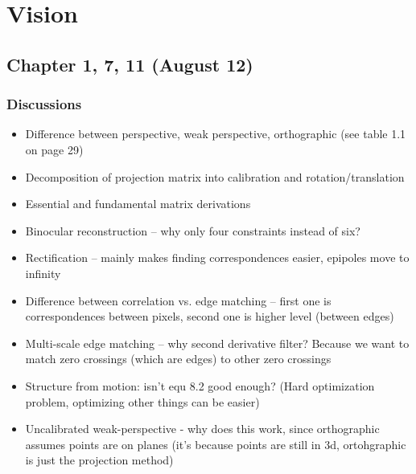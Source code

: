\section{Vision}

\subsection{Chapter 1, 7, 11 (August 12)}

\subsubsection*{Discussions}
\begin{itemize}
\item Difference between perspective, weak perspective, orthographic (see table 1.1 on page 29)
\item Decomposition of projection matrix into calibration and rotation/translation
\item Essential and fundamental matrix derivations
\item Binocular reconstruction -- why only four constraints instead of six?
\item Rectification -- mainly makes finding correspondences easier, epipoles move to infinity
\item Difference between correlation vs. edge matching -- first one is correspondences between pixels, second one is higher level (between edges)
\item Multi-scale edge matching -- why second derivative filter? Because we want to match zero crossings (which are edges) to other zero crossings
\item Structure from motion: isn't equ 8.2 good enough? (Hard optimization problem, optimizing other things can be easier)
\item Uncalibrated weak-perspective - why does this work, since orthographic assumes points are on planes (it's because points are still in 3d, ortohgraphic is just the projection method)
\end{itemize}

